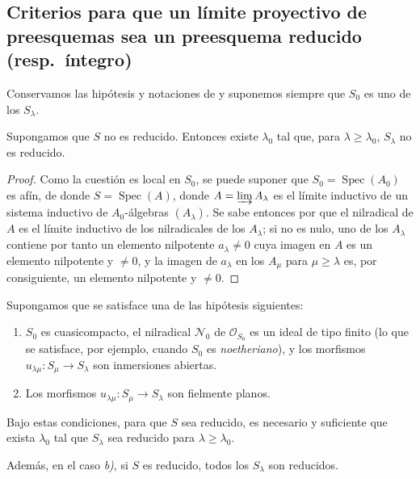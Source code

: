 \subsection{Criterios para que un límite proyectivo de preesquemas sea un preesquema reducido (resp.\ íntegro)}
\label{subsection:IV.8.7-fr}

Conservamos las hipótesis y notaciones de  y suponemos siempre que $S_0$ es uno de los $S_\lambda$.

\begin{proposition}[8.7.1]
\label{IV.8.7.1-fr}
Supongamos que $S$ no es reducido.
Entonces existe $\lambda_0$ tal que, para $\lambda\geq\lambda_0$, $S_\lambda$ no es reducido.
\end{proposition}

\begin{proof}
Como la cuestión es local en $S_0$, se puede suponer que $S_0=\operatorname{Spec}(A_0)$ es afín, de donde $S=\operatorname{Spec}(A)$, donde $A=\varinjlim A_\lambda$ es el límite inductivo de un sistema inductivo de $A_0$-álgebras $(A_\lambda)$.
Se sabe entonces por  que el nilradical de $A$ es el límite inductivo de los nilradicales de los $A_\lambda$; si no es nulo, uno de los $A_\lambda$ contiene por tanto un elemento nilpotente $a_\lambda\neq0$ cuya imagen en $A$ es un elemento nilpotente y $\neq0$, y la imagen de $a_\lambda$ en los $A_\mu$ para $\mu\geq\lambda$ es, por consiguiente, un elemento nilpotente y $\neq0$.
\end{proof}

\begin{proposition}[8.7.2]
\label{IV.8.7.2-fr}
Supongamos que se satisface \textup{una} de las hipótesis siguientes:
\begin{enumerate}[label=\emph{\alph*)}]
\item $S_0$ es cuasicompacto, el nilradical $\mathcal N_0$ de $\mathcal O_{S_0}$ es un ideal de tipo finito \textup{(lo que se satisface, por ejemplo, cuando $S_0$ es \emph{noetheriano})}, y los morfismos $u_{\lambda\mu}:S_\mu\to S_\lambda$ son inmersiones abiertas.
\item Los morfismos $u_{\lambda\mu}:S_\mu\to S_\lambda$ son fielmente planos.
\end{enumerate}
Bajo estas condiciones, para que $S$ sea reducido, es necesario y suficiente que exista $\lambda_0$ tal que $S_\lambda$ sea reducido para $\lambda\geq\lambda_0$.

Además, en el caso \emph{b)}, si $S$ es reducido, todos los $S_\lambda$ son reducidos.
\end{proposition}

